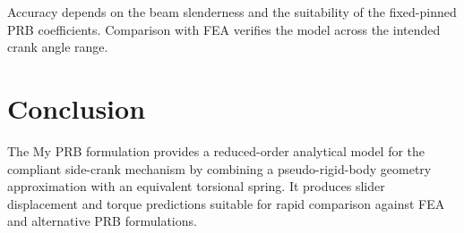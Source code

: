 \documentclass[11pt]{article}
\begin{document}
Accuracy depends on the beam slenderness and the suitability of the fixed-pinned PRB coefficients. Comparison with FEA verifies the model across the intended crank angle range.

\section{Conclusion}

The My PRB formulation provides a reduced-order analytical model for the compliant side-crank mechanism by combining a pseudo-rigid-body geometry approximation with an equivalent torsional spring. It produces slider displacement and torque predictions suitable for rapid comparison against FEA and alternative PRB formulations.
\end{document}
